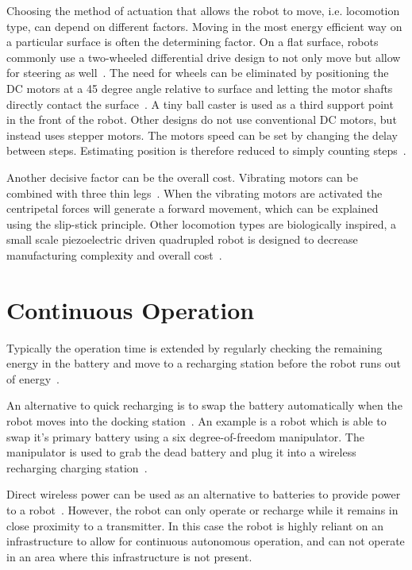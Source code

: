 Choosing the method of actuation that allows the robot to move, i.e. locomotion type, can depend on different factors.
Moving in the most energy efficient way on a particular surface is often the determining factor.
On a flat surface, robots commonly use a two-wheeled differential drive design to not only move but allow for steering as well~\cite{sabelhaus_icra_2013, pickem_icra_2015}.
The need for wheels can be eliminated by positioning the DC motors at a 45 degree angle relative to surface and letting the motor shafts directly contact the surface~\cite{kim_iros_2016}.
A tiny ball caster is used as a third support point in the front of the robot.
Other designs do not use conventional DC motors, but instead uses stepper motors.
The motors speed can be set by changing the delay between steps. 
Estimating position is therefore reduced to simply counting steps~\cite{pickem_icra_2015}.

Another decisive factor can be the overall cost.
Vibrating motors can be combined with three thin legs~\cite{rubenstein_icra_2012}.
When the vibrating motors are activated the centripetal forces will generate a forward movement, which can be explained using the slip-stick principle.
Other locomotion types are biologically inspired, a small scale piezoelectric driven quadrupled robot is designed to decrease manufacturing complexity and overall cost~\cite{baisch_iros_2013}.

\section{Continuous Operation}
\label{sec:rw_continous_operation}

Typically the operation time is extended by regularly checking the remaining energy in the battery and move to a recharging station before the robot runs out of energy~\cite{pickem_icra_2015, rubenstein_icra_2012}.

An alternative to quick recharging is to swap the battery automatically when the robot moves into the docking station~\cite{kemal_mech_2015}.
An example is a robot which is able to swap it's primary battery using a six degree-of-freedom manipulator.
The manipulator is used to grab the dead battery and plug it into a wireless recharging charging station~\cite{zhang_conel_2013}.

Direct wireless power can be used as an alternative to batteries to provide power to a robot~\cite{karpelson_icra_2014}.
However, the robot can only operate or recharge while it remains in close proximity to a transmitter. 
In this case the robot is highly reliant on an infrastructure to allow for continuous autonomous operation, and can not operate in an area where this infrastructure is not present.
 
